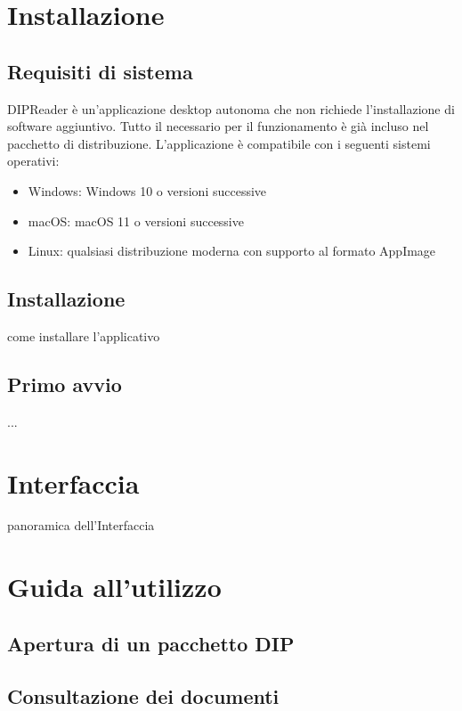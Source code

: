 \documentclass[a4paper,12pt]{article}
\begin{document}
    \section{Installazione}
        \subsection{Requisiti di sistema}

        DIPReader è un'applicazione desktop autonoma che non richiede l'installazione di software aggiuntivo. Tutto il necessario per il funzionamento è già incluso nel pacchetto di distribuzione. 
        L'applicazione è compatibile con i seguenti sistemi operativi:
        \begin{itemize}
            \item Windows: Windows 10 o versioni successive
            \item macOS: macOS 11 o versioni successive
            \item Linux: qualsiasi distribuzione moderna con supporto al formato AppImage
        \end{itemize}

        \subsection{Installazione}
            come installare l'applicativo

        \subsection{Primo avvio} {
            ...
        }

    \section{Interfaccia}
        panoramica dell'Interfaccia

    \section{Guida all'utilizzo}
        \subsection{Apertura di un pacchetto DIP}

        \subsection{Consultazione dei documenti}
\end{document}
